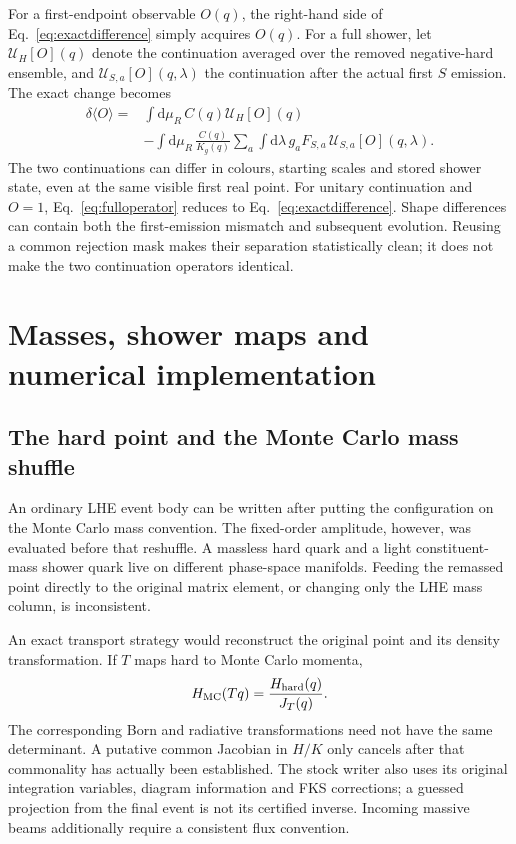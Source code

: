 \documentclass[11pt,a4paper]{article}
\newcommand{\dd}{\mathrm{d}}
\newcommand{\U}{\mathcal U}
\begin{document}
For a first-endpoint observable $O(q)$, the right-hand side of
Eq.~\eqref{eq:exactdifference} simply acquires $O(q)$. For a full shower,
let $\U_H[O](q)$ denote the continuation averaged over the removed
negative-hard ensemble, and $\U_{S,a}[O](q,\lambda)$ the continuation
after the actual first $S$ emission. The exact change becomes
\begin{align}
 \delta\langle O\rangle={}&\int\dd\mu_R\,C(q)\U_H[O](q)
 \nonumber\\
 &-\int\dd\mu_R\,\frac{C(q)}{K_g(q)}
       \sum_a\int\dd\lambda\,g_aF_{S,a}\,
                         \U_{S,a}[O](q,\lambda).
 \label{eq:fulloperator}
\end{align}
The two continuations can differ in colours, starting scales and
stored shower state, even at the same visible first real point. For
unitary continuation and $O=1$, Eq.~\eqref{eq:fulloperator} reduces to
Eq.~\eqref{eq:exactdifference}. Shape differences can contain both the
first-emission mismatch and subsequent evolution. Reusing a common
rejection mask makes their separation statistically clean; it does
not make the two continuation operators identical.

\section{Masses, shower maps and numerical implementation}
\label{sec:implementation}

\subsection{The hard point and the Monte Carlo mass shuffle}
\label{sec:masses}
An ordinary LHE event body can be written after putting the configuration
on the Monte Carlo mass convention. The fixed-order amplitude, however,
was evaluated before that reshuffle. A massless hard quark and a light
constituent-mass shower quark live on different phase-space manifolds.
Feeding the remassed point directly to the original matrix element, or
changing only the LHE mass column, is inconsistent.

An exact transport strategy would reconstruct the original point and
its density transformation. If $T$ maps hard to Monte Carlo momenta,
\begin{equation}
 H_{\rm MC}(Tq)=\frac{H_{\rm hard}(q)}{J_T(q)}.
 \label{eq:transport}
\end{equation}
The corresponding Born and radiative transformations need not have
the same determinant. A putative common Jacobian in $H/K$ only cancels
after that commonality has actually been established. The stock writer
also uses its original integration variables, diagram information and
FKS corrections; a guessed projection from the final event is not its
certified inverse. Incoming massive beams additionally require a
consistent flux convention.
\end{document}
